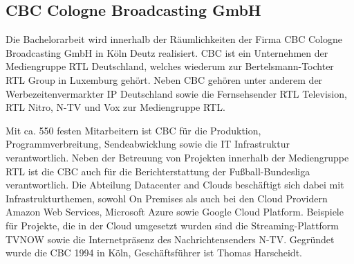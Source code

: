 \subsection{CBC Cologne Broadcasting GmbH}

Die Bachelorarbeit wird innerhalb der Räumlichkeiten der Firma CBC Cologne Broadcasting GmbH in Köln Deutz realisiert.
CBC ist ein Unternehmen der Mediengruppe RTL Deutschland, welches wiederum zur Bertelsmann-Tochter RTL Group in Luxemburg gehört.
Neben CBC gehören unter anderem der Werbezeitenvermarkter IP Deutschland sowie die Fernsehsender RTL Television, RTL Nitro, N-TV und Vox zur Mediengruppe RTL.


Mit ca. 550 festen Mitarbeitern ist CBC für die Produktion, Programmverbreitung, Sendeabwicklung sowie die IT Infrastruktur verantwortlich.
Neben der Betreuung von Projekten innerhalb der Mediengruppe RTL ist die CBC auch für die Berichterstattung der Fußball-Bundesliga verantwortlich.
Die Abteilung Datacenter and Clouds beschäftigt sich dabei mit Infrastrukturthemen, sowohl On Premises als auch bei den Cloud Providern Amazon Web Services, Microsoft Azure sowie Google Cloud Platform.
Beispiele für Projekte, die in der Cloud umgesetzt wurden sind die Streaming-Plattform TVNOW sowie die Internetpräsenz des Nachrichtensenders N-TV.
Gegründet wurde die CBC 1994 in Köln, Geschäftsführer ist Thomas Harscheidt.
